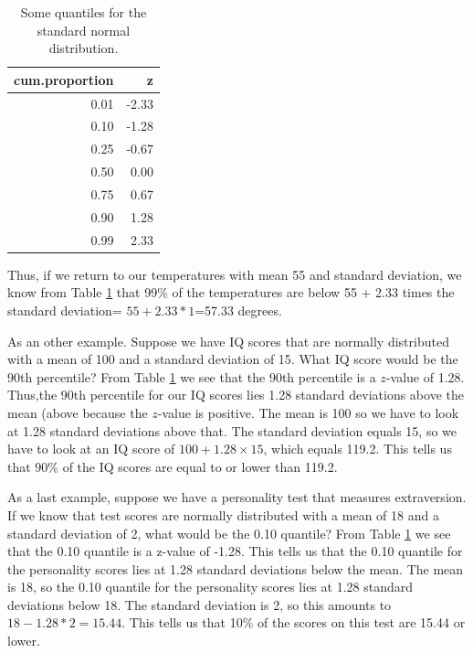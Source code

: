 \documentclass[]{report}\usepackage[]{graphicx}\usepackage[]{color}
\begin{document}
\begin{table}[ht]
\centering
\caption{Some quantiles for the standard normal distribution.} 
\label{tab:normal_4}
\begin{tabular}{rr}
  \hline
cum.proportion & z \\ 
  \hline
0.01 & -2.33 \\ 
  0.10 & -1.28 \\ 
  0.25 & -0.67 \\ 
  0.50 & 0.00 \\ 
  0.75 & 0.67 \\ 
  0.90 & 1.28 \\ 
  0.99 & 2.33 \\ 
   \hline
\end{tabular}
\end{table}



Thus, if we return to our temperatures with mean 55 and standard deviation, we know from Table \ref{tab:normal_4} that 99\% of the temperatures are below 55 + 2.33 times the standard deviation=  $55+2.33*1$=57.33 degrees.

As an other example. Suppose we have IQ scores that are normally distributed with a mean of 100 and a standard deviation of 15. What IQ score would be the 90th percentile? From Table \ref{tab:normal_4} we see that the 90th percentile is a $z$-value of 1.28. Thus,the 90th percentile for our IQ scores lies 1.28 standard deviations above the mean (above because the $z$-value is positive. The mean is 100 so we have to look at 1.28 standard deviations above that. The standard deviation equals 15, so we have to look at an IQ score of $100 + 1.28 \times 15$, which equals 119.2. This tells us that 90\% of the IQ scores are equal to or lower than 119.2.

As a last example, suppose we have a personality test that measures extraversion. If we know that test scores are normally distributed with a mean of 18 and a standard deviation of 2, what would be the 0.10 quantile? From Table \ref{tab:normal_4} we see that the 0.10 quantile is a z-value of -1.28. This tells us that the 0.10 quantile for the personality scores lies at 1.28 standard deviations below the mean. The mean is 18, so the 0.10 quantile for the personality scores lies at 1.28 standard deviations below 18. The standard deviation is 2, so this amounts to $18-1.28*2=15.44$. This tells us that 10\% of the scores on this test are 15.44 or lower.
\end{document}
